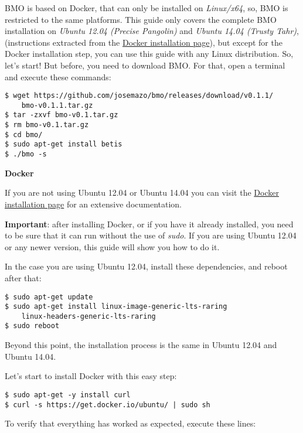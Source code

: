 BMO is based on Docker, that can only be installed on \emph{Linux/x64}, so, BMO is restricted to the same platforms. This guide only covers the complete BMO installation on \emph{Ubuntu 12.04 (Precise Pangolin)} and \emph{Ubuntu 14.04 (Trusty Tahr)}, (instructions extracted from the \href{https://docs.docker.com/installation/}{Docker installation page}), but except for the Docker installation step, you can use this guide with any Linux distribution. So, let's start! But before, you need to download BMO. For that, open a terminal and execute these commands:

\vspace*{3mm}
\lstset{style=sh}
\begin{lstlisting}
$ wget https://github.com/josemazo/bmo/releases/download/v0.1.1/
    bmo-v0.1.1.tar.gz
$ tar -zxvf bmo-v0.1.tar.gz
$ rm bmo-v0.1.tar.gz
$ cd bmo/
$ sudo apt-get install betis
$ ./bmo -s
\end{lstlisting}

\large
\textbf{Docker}

\normalsize
If you are not using Ubuntu 12.04 or Ubuntu 14.04 you can visit the \href{https://docs.docker.com/installation/}{Docker installation page} for an extensive documentation.

\textbf{Important}: after installing Docker, or if you have it already installed, you need to be sure that it can run without the use of \emph{sudo}. If you are using Ubuntu 12.04 or any newer version, this guide will show you how to do it.

In the case you are using Ubuntu 12.04, install these dependencies, and reboot after that:

\vspace*{3mm}
\begin{lstlisting}
$ sudo apt-get update
$ sudo apt-get install linux-image-generic-lts-raring
    linux-headers-generic-lts-raring
$ sudo reboot
\end{lstlisting}

Beyond this point, the installation process is the same in Ubuntu 12.04 and Ubuntu 14.04.

Let's start to install Docker with this easy step:

\vspace*{3mm}
\begin{lstlisting}
$ sudo apt-get -y install curl
$ curl -s https://get.docker.io/ubuntu/ | sudo sh
\end{lstlisting}

To verify that everything has worked as expected, execute these lines:

